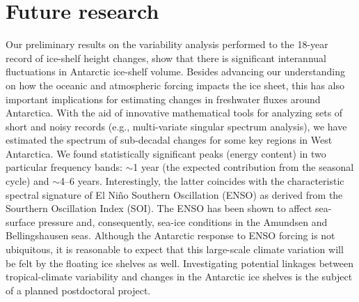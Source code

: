 \section*{Future research}

Our preliminary results on the variability analysis performed to the 18-year record of ice-shelf height changes, show that there is significant interannual fluctuations in Antarctic ice-shelf volume. Besides advancing our understanding on how the oceanic and atmospheric forcing impacts the ice sheet, this has also important implications for estimating changes in freshwater fluxes around Antarctica. With the aid of innovative mathematical tools for analyzing sets of short and noisy records (e.g., multi-variate singular spectrum analysis), we have estimated the spectrum of sub-decadal changes for some key regions in West Antarctica. We found statistically significant peaks (energy content) in two particular frequency bands: $\sim$1 year (the expected contribution from the seasonal cycle) and $\sim$4--6 years. Interestingly, the latter coincides with the characteristic spectral signature of El Ni\~no Southern Oscillation (ENSO) as derived from the Sourthern Oscillation Index (SOI). The ENSO has been shown to affect sea-surface pressure and, consequently, sea-ice conditions in the Amundsen and Bellingshausen seas. Although the Antarctic response to ENSO forcing is not ubiquitous, it is reasonable to expect that this large-scale climate variation will be felt by the floating ice shelves as well. Investigating potential linkages between tropical-climate variability and changes in the Antarctic ice shelves is the subject of a planned postdoctoral project.
